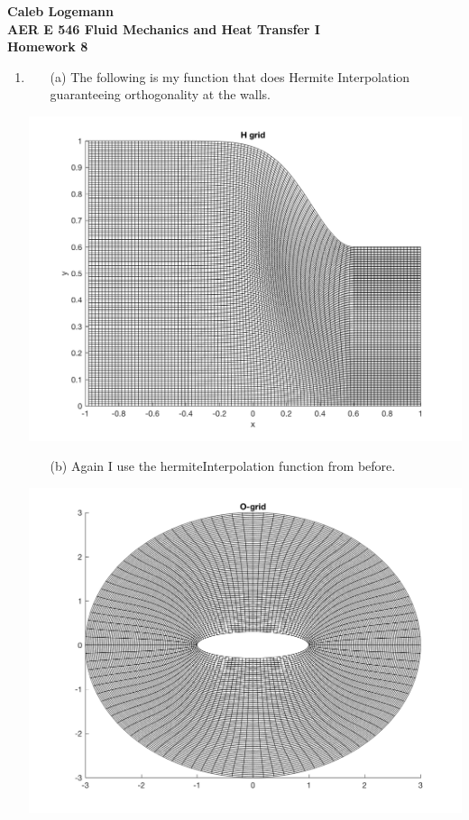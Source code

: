 \documentclass[11pt, oneside]{article}
\begin{document}
\noindent \textbf{\Large{Caleb Logemann \\
AER E 546 Fluid Mechanics and Heat Transfer I \\
Homework 8
}}

%
\begin{enumerate}
  \item %
    \begin{enumerate}
      \item[(a)]
        The following is my function that does Hermite Interpolation
        guaranteeing orthogonality at the walls.
        
    \end{enumerate}
      \begin{center}
        \includegraphics[scale=0.9]{Figures/07_01.png}
      \end{center}

    \begin{enumerate}
      \item[(b)]
        Again I use the hermiteInterpolation function from before.
    \end{enumerate}
      \begin{center}
        \includegraphics[scale=0.9]{Figures/07_02.png}
      \end{center}


\end{enumerate}
\end{document}
